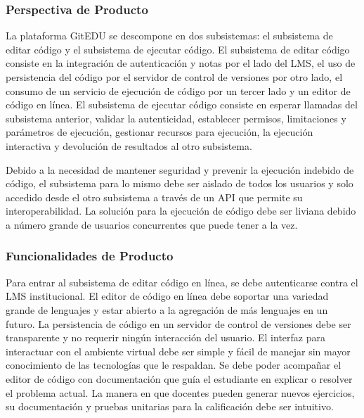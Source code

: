 \subsubsection{Perspectiva de Producto}
    
La plataforma GitEDU se descompone en dos subsistemas: el subsistema de editar código y el subsistema de ejecutar código. El subsistema de editar código consiste en la integración de autenticación y notas por el lado del LMS, el uso de persistencia del código por el servidor de control de versiones por otro lado, el consumo de un servicio de ejecución de código por un tercer lado y un editor de código en línea. El subsistema de ejecutar código consiste en esperar llamadas del subsistema anterior, validar la autenticidad, establecer permisos, limitaciones y parámetros de ejecución, gestionar recursos para ejecución, la ejecución interactiva y devolución de resultados al otro subsistema.

Debido a la necesidad de mantener seguridad y prevenir la ejecución indebido de código, el subsistema para lo mismo debe ser aislado de todos los usuarios y solo accedido desde el otro subsistema a través de un API que permite su interoperabilidad. La solución para la ejecución de código debe ser liviana debido a número grande de usuarios concurrentes que puede tener a la vez.

\subsubsection{Funcionalidades de Producto}
     
Para entrar al subsistema de editar código en línea, se debe autenticarse contra el LMS  institucional. El editor de código en línea debe soportar una variedad grande de lenguajes y estar abierto a la agregación de más lenguajes en un futuro. La persistencia de código en un servidor de control de versiones debe ser transparente y no requerir ningún interacción del usuario. El interfaz para interactuar con el ambiente virtual debe ser simple y fácil de manejar sin mayor conocimiento de las tecnologías que le respaldan. Se debe poder acompañar el editor de código con documentación que guía el estudiante en explicar o resolver el problema actual. La manera en que docentes pueden generar nuevos ejercicios, su documentación y pruebas unitarias para la calificación debe ser intuitivo.

